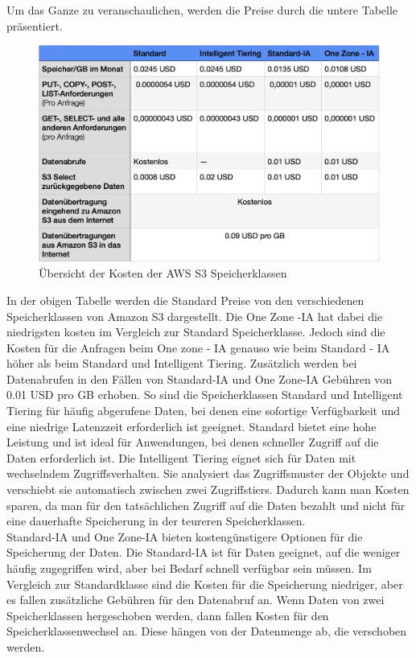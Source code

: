 Um das Ganze zu veranschaulichen, werden die Preise durch die untere Tabelle präsentiert.

\begin{figure}[h]
	\centering
	\includegraphics[width=12cm,keepaspectratio]{Pictures/AllgKostenAWS.png}
	\caption{Übersicht der Kosten der AWS S3 Speicherklassen}
\end{figure}

In der obigen Tabelle werden die Standard Preise von den verschiedenen Speicherklassen von Amazon S3 dargestellt. Die One Zone -IA hat dabei die niedrigsten kosten im Vergleich zur Standard Speicherklasse. Jedoch sind die Kosten für die Anfragen beim One zone - IA genauso wie beim Standard - IA höher als beim Standard und Intelligent Tiering. Zusätzlich werden bei Datenabrufen in den Fällen von Standard-IA und One Zone-IA Gebühren von 0.01 USD pro GB erhoben. So sind die Speicherklassen Standard und Intelligent Tiering für häufig abgerufene Daten, bei denen eine sofortige Verfügbarkeit und eine niedrige Latenzzeit erforderlich ist geeignet. Standard bietet eine hohe Leistung und ist ideal für Anwendungen, bei denen schneller Zugriff auf die Daten erforderlich ist. Die Intelligent Tiering eignet sich für Daten mit wechselndem Zugriffsverhalten. Sie analysiert das Zugriffsmuster der Objekte und verschiebt sie automatisch zwischen zwei Zugriffstiers. Dadurch kann man Kosten sparen, da man für den tatsächlichen Zugriff auf die Daten bezahlt und nicht für eine dauerhafte Speicherung in der teureren Speicherklassen.\\

Standard-IA und One Zone-IA bieten kostengünstigere Optionen für die Speicherung der Daten. Die Standard-IA ist für Daten geeignet, auf die weniger häufig zugegriffen wird, aber bei Bedarf schnell verfügbar sein müssen. Im Vergleich zur Standardklasse sind die Kosten für die Speicherung niedriger, aber es fallen zusätzliche Gebühren für den Datenabruf an. Wenn Daten von zwei Speicherklassen hergeschoben werden, dann fallen Kosten für den Speicherklassenwechsel an. Diese hängen von der Datenmenge ab, die verschoben werden.\\

